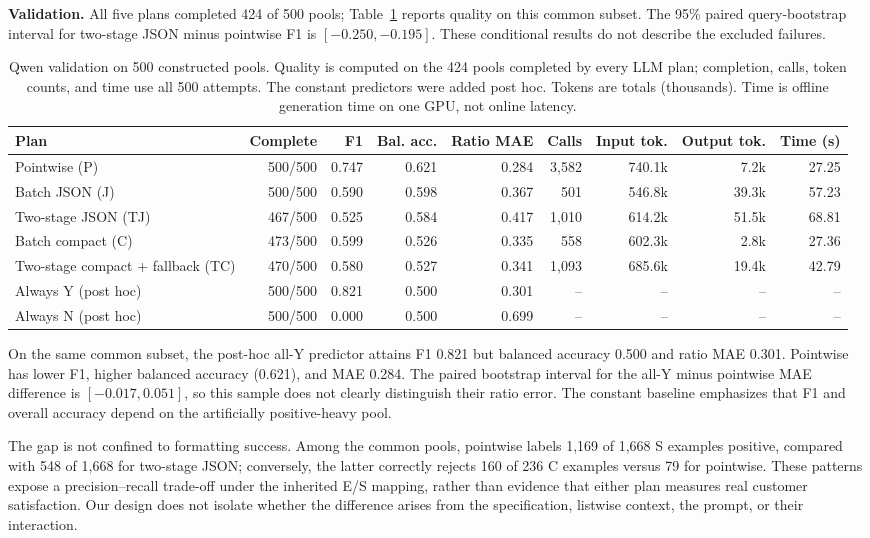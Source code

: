 \documentclass[conference]{IEEEtran}
\begin{document}
\textbf{Validation.}
All five plans completed 424 of 500 pools; Table~\ref{tab:main} reports quality on this common subset. The 95\% paired query-bootstrap interval for two-stage JSON minus pointwise F1 is $[-0.250,-0.195]$. These conditional results do not describe the excluded failures.

\begin{table}[t]
\caption{Qwen validation on 500 constructed pools. Quality is computed on the 424 pools completed by every LLM plan; completion, calls, token counts, and time use all 500 attempts. The constant predictors were added post hoc. Tokens are totals (thousands). Time is offline generation time on one GPU, not online latency.}
\label{tab:main}
\centering\small
\begin{tabular}{lrrrrrrrr}
\toprule
Plan & Complete & F1 & Bal. acc. & Ratio MAE & Calls & Input tok. & Output tok. & Time (s) \\
\midrule
Pointwise (P) & 500/500 & 0.747 & 0.621 & 0.284 & 3,582 & 740.1k & 7.2k & 27.25 \\
Batch JSON (J) & 500/500 & 0.590 & 0.598 & 0.367 & 501 & 546.8k & 39.3k & 57.23 \\
Two-stage JSON (TJ) & 467/500 & 0.525 & 0.584 & 0.417 & 1,010 & 614.2k & 51.5k & 68.81 \\
Batch compact (C) & 473/500 & 0.599 & 0.526 & 0.335 & 558 & 602.3k & 2.8k & 27.36 \\
Two-stage compact + fallback (TC) & 470/500 & 0.580 & 0.527 & 0.341 & 1,093 & 685.6k & 19.4k & 42.79 \\
Always Y (post hoc) & 500/500 & 0.821 & 0.500 & 0.301 & -- & -- & -- & -- \\
Always N (post hoc) & 500/500 & 0.000 & 0.500 & 0.699 & -- & -- & -- & -- \\
\bottomrule
\end{tabular}
\end{table}



On the same common subset, the post-hoc all-Y predictor attains F1 0.821 but balanced accuracy 0.500 and ratio MAE 0.301. Pointwise has lower F1, higher balanced accuracy (0.621), and MAE 0.284. The paired bootstrap interval for the all-Y minus pointwise MAE difference is $[-0.017,0.051]$, so this sample does not clearly distinguish their ratio error. The constant baseline emphasizes that F1 and overall accuracy depend on the artificially positive-heavy pool.

The gap is not confined to formatting success. Among the common pools, pointwise labels 1,169 of 1,668 S examples positive, compared with 548 of 1,668 for two-stage JSON; conversely, the latter correctly rejects 160 of 236 C examples versus 79 for pointwise. These patterns expose a precision--recall trade-off under the inherited E/S mapping, rather than evidence that either plan measures real customer satisfaction. Our design does not isolate whether the difference arises from the specification, listwise context, the prompt, or their interaction.
\end{document}
